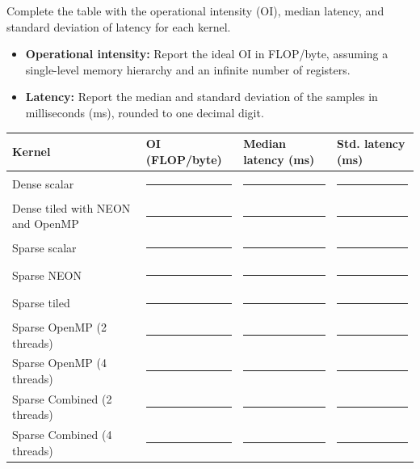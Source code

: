 \documentclass[a4paper,11pt]{article}
\newcommand{\blank}[1][1.2cm]{\rule{#1}{0.4pt}}
\begin{document}
Complete the table with the operational intensity (OI), median latency,
and standard deviation of latency for each kernel.

\begin{itemize}
    \item \textbf{Operational intensity:}
    Report the ideal OI in FLOP/byte, assuming a single-level memory
    hierarchy and an infinite number of registers. 
    \item \textbf{Latency:}
    Report the median and standard deviation of the samples in milliseconds (ms), rounded
    to one decimal digit.
\end{itemize}

\begin{center}
\renewcommand{\arraystretch}{1.25}
\begin{tabularx}{\textwidth}{
    @{}
    >{\raggedright\arraybackslash}X
    >{\centering\arraybackslash}p{2.0cm}
    >{\centering\arraybackslash}p{2.6cm}
    >{\centering\arraybackslash}p{2.6cm}
    @{}
}
\toprule
Kernel
& OI (FLOP/byte)
& Median latency (ms)
& Std. latency (ms) \\
\midrule
Dense scalar
& \blank
& \blank[1.5cm]
& \blank[1.5cm] \\

Dense tiled with NEON and OpenMP
& \blank
& \blank[1.5cm]
& \blank[1.5cm] \\

Sparse scalar
& \blank
& \blank[1.5cm]
& \blank[1.5cm] \\

Sparse NEON
& \blank
& \blank[1.5cm]
& \blank[1.5cm] \\

Sparse tiled
& \blank
& \blank[1.5cm]
& \blank[1.5cm] \\

Sparse OpenMP (2 threads)
& \blank
& \blank[1.5cm]
& \blank[1.5cm] \\

Sparse OpenMP (4 threads)
& \blank
& \blank[1.5cm]
& \blank[1.5cm] \\

Sparse Combined (2 threads)
& \blank
& \blank[1.5cm]
& \blank[1.5cm] \\

Sparse Combined (4 threads)
& \blank
& \blank[1.5cm]
& \blank[1.5cm] \\

\bottomrule
\end{tabularx}
\end{center}
\end{document}
